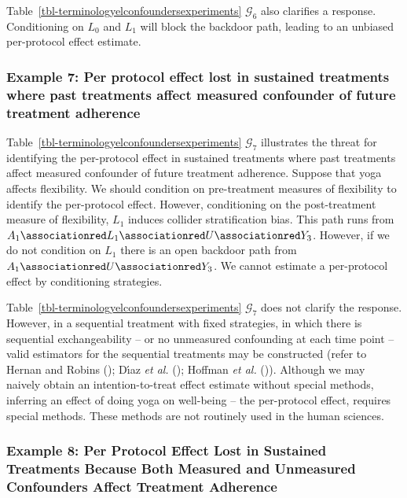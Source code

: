 \documentclass[
  single column]{article}
\begin{document}
Table~\ref{tbl-terminologyelconfoundersexperiments} \(\mathcal{G}_{6}\)
also clarifies a response. Conditioning on \(L_0\) and \(L_1\) will
block the backdoor path, leading to an unbiased per-protocol effect
estimate.

\subsubsection{Example 7: Per protocol effect lost in sustained
treatments where past treatments affect measured confounder of future
treatment
adherence}\label{example-7-per-protocol-effect-lost-in-sustained-treatments-where-past-treatments-affect-measured-confounder-of-future-treatment-adherence}

Table~\ref{tbl-terminologyelconfoundersexperiments} \(\mathcal{G}_{7}\)
illustrates the threat for identifying the per-protocol effect in
sustained treatments where past treatments affect measured confounder of
future treatment adherence. Suppose that yoga affects flexibility. We
should condition on pre-treatment measures of flexibility to identify
the per-protocol effect. However, conditioning on the post-treatment
measure of flexibility, \(\boxed{L_1}\) induces collider stratification
bias. This path runs from
\(A_1 \associationred L_1 \associationred U \associationred Y_3\).
However, if we do not condition on \(L_1\) there is an open backdoor
path from \(A_1 \associationred U \associationred Y_3\). We cannot
estimate a per-protocol effect by conditioning strategies.

Table~\ref{tbl-terminologyelconfoundersexperiments} \(\mathcal{G}_{7}\)
does not clarify the response. However, in a sequential treatment with
fixed strategies, in which there is sequential exchangeability -- or no
unmeasured confounding at each time point -- valid estimators for the
sequential treatments may be constructed (refer to Hernan and Robins
(); Dı́az \emph{et al.}
(); Hoffman \emph{et al.}
()). Although we may naively obtain an
intention-to-treat effect estimate without special methods, inferring an
effect of doing yoga on well-being -- the per-protocol effect, requires
special methods. These methods are not routinely used in the human
sciences.

\subsubsection{Example 8: Per Protocol Effect Lost in Sustained
Treatments Because Both Measured and Unmeasured Confounders Affect
Treatment
Adherence}\label{example-8-per-protocol-effect-lost-in-sustained-treatments-because-both-measured-and-unmeasured-confounders-affect-treatment-adherence}
\end{document}
